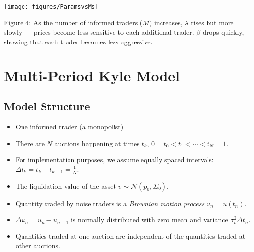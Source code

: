 \documentclass{beamer}
\begin{document}
\begin{frame}
\centering
\texttt{[image: figures/ParamsvsMs]}

\vspace{0.5em}
{\tiny {\textcolor[RGB]{41,49,202}{Figure 4:}} As the number of informed traders ($M$) increases, $\lambda$ rises but more slowly — prices become less sensitive to each additional trader. $\beta$ drops quickly, showing that each trader becomes less aggressive.}
\end{frame}

\section{Multi-Period Kyle Model}
\subsection{Model Structure}

\begin{frame}
    \begin{itemize}
        \item One informed trader (a monopolist)
        \item There are $N$ auctions happening at times $t_k$, $0 = t_0 < t_1 < \cdots < t_N = 1$.
        \item For implementation purposes, we assume equally spaced intervals: $\Delta t_k = t_k - t_{k-1} = \frac{1}{N}$.
        \item The liquidation value of the asset $v \sim \mathcal{N}(p_0, \Sigma_0)$.
    \end{itemize}
\end{frame} 

\begin{frame}
    \begin{itemize}
        \item Quantity traded by noise traders is a \textit{Brownian motion process} $u_n = u(t_n)$.
        \item $\Delta u_n = u_n - u_{n-1}$ is normally distributed with zero mean and variance $\sigma^2_t\Delta t_n$.
        \item Quantities traded at one auction are independent of the quantities traded at other auctions.
    \end{itemize}
\end{frame}
\end{document}
